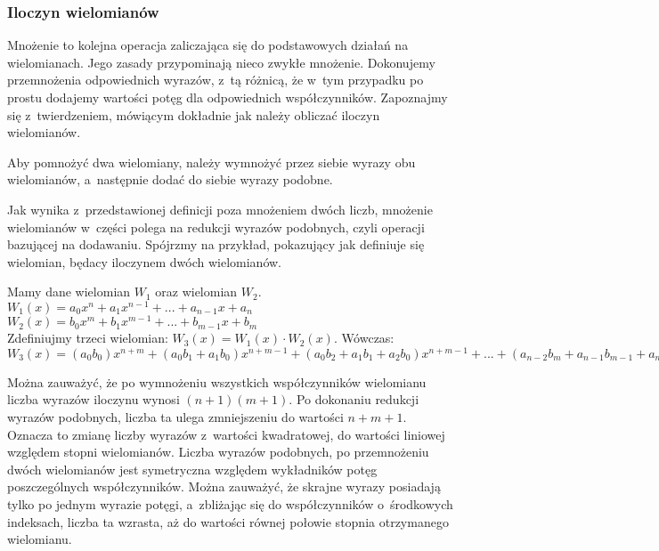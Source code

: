 \subsubsection{Iloczyn wielomianów}

Mnożenie to kolejna operacja zaliczająca się do podstawowych działań na wielomianach. Jego zasady przypominają nieco zwykłe mnożenie. Dokonujemy przemnożenia odpowiednich wyrazów, z~tą różnicą, że w~tym przypadku po prostu dodajemy wartości potęg dla odpowiednich współczynników. Zapoznajmy się z~twierdzeniem, mówiącym dokładnie jak należy obliczać iloczyn wielomianów.

\begin{theorem}
	$ $\\
	Aby pomnożyć dwa wielomiany, należy wymnożyć przez siebie wyrazy obu wielomianów, a~następnie dodać do siebie wyrazy podobne.
\end{theorem}

Jak wynika z~przedstawionej definicji poza mnożeniem dwóch liczb, mnożenie wielomianów w~części polega na redukcji wyrazów podobnych, czyli operacji bazującej na dodawaniu. Spójrzmy na przykład, pokazujący jak definiuje się wielomian, będacy iloczynem dwóch wielomianów.

\begin{example}
	$ $\\
	Mamy dane wielomian $W_1$ oraz wielomian $W_2$. \\
	$W_1(x) = a_0x^n + a_1x^{n-1} + ... + a_{n-1}x + a_n$ \\
	$W_2(x) = b_0x^m + b_1x^{m-1} + ... + b_{m-1}x + b_m$ \\
	Zdefiniujmy trzeci wielomian: $W_3(x) = W_1(x) \cdot W_2(x)$. Wówczas: \\
	$W_3(x) = (a_0b_0)x^{n+m} + (a_0b_1+a_1b_0)x^{n+m-1} + (a_0b_2+a_1b_1+a_2b_0)x^{n+m-1} + ... + (a_{n-2}b_m+a_{n-1}b_{m-1}+a_nb_{m-2})x^2 + (a_{n-1}b_m + a_nb_{m-1})x + a_nb_m$
\end{example}

Można zauważyć, że po wymnożeniu wszystkich współczynników wielomianu liczba wyrazów iloczynu wynosi $(n+1)(m+1)$. Po dokonaniu redukcji wyrazów podobnych, liczba ta ulega zmniejszeniu do wartości $n+m+1$. Oznacza to zmianę liczby wyrazów z~wartości kwadratowej, do wartości liniowej względem stopni wielomianów. Liczba wyrazów podobnych, po przemnożeniu dwóch wielomianów jest symetryczna względem wykładników potęg poszczególnych współczynników. Można zauważyć, że skrajne wyrazy posiadają tylko po jednym wyrazie potęgi, a~zbliżając się do współczynników o~środkowych indeksach, liczba ta wzrasta, aż do wartości równej połowie stopnia otrzymanego wielomianu.

